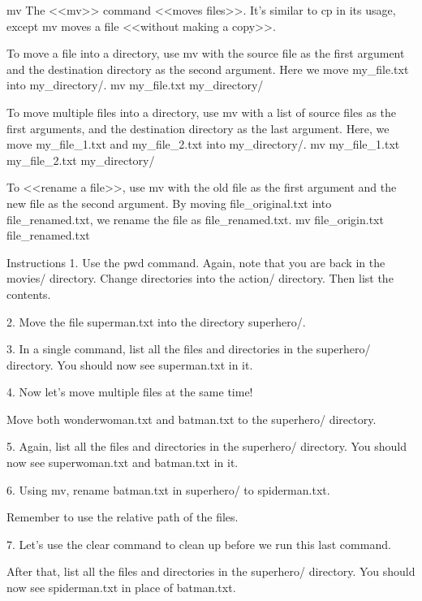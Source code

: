 mv
    The <<mv>> command <<moves files>>. It’s similar to cp in its usage, except mv moves a file <<without making a copy>>.

    To move a file into a directory, use mv with the source file as the first argument and the destination directory as the second argument. Here we move my_file.txt into my_directory/.
        mv my_file.txt my_directory/
    
    To move multiple files into a directory, use mv with a list of source files as the first arguments, and the destination directory as the last argument. Here, we move my_file_1.txt and my_file_2.txt into my_directory/.
        mv my_file_1.txt my_file_2.txt my_directory/
    
    To <<rename a file>>, use mv with the old file as the first argument and the new file as the second argument. By moving file_original.txt into file_renamed.txt, we rename the file as file_renamed.txt.
        mv file_origin.txt file_renamed.txt

Instructions
    1.
    Use the pwd command. Again, note that you are back in the movies/ directory. Change directories into the action/ directory. Then list the contents.

    2.
    Move the file superman.txt into the directory superhero/.

    3.
    In a single command, list all the files and directories in the superhero/ directory. You should now see superman.txt in it.

    4.
    Now let’s move multiple files at the same time!

    Move both wonderwoman.txt and batman.txt to the superhero/ directory.

    5.
    Again, list all the files and directories in the superhero/ directory. You should now see superwoman.txt and batman.txt in it.

    6.
    Using mv, rename batman.txt in superhero/ to spiderman.txt.

    Remember to use the relative path of the files.

    7.
    Let’s use the clear command to clean up before we run this last command.

    After that, list all the files and directories in the superhero/ directory. You should now see spiderman.txt in place of batman.txt.